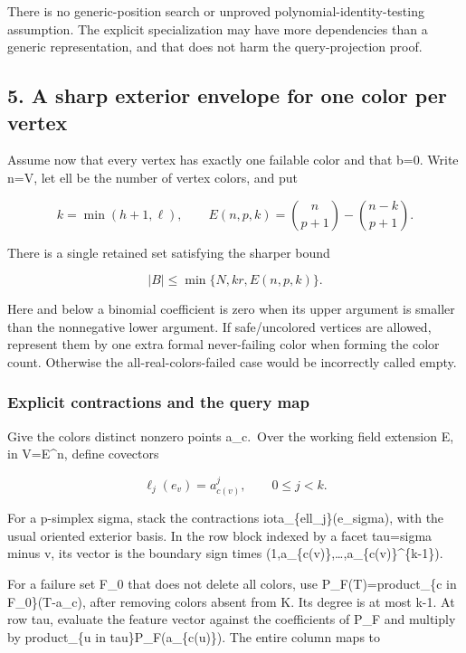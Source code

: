 There is no generic-position search or unproved polynomial-identity-testing assumption. The explicit specialization may have more dependencies than a generic representation, and that does not harm the query-projection proof.

\hypertarget{af-3f6acd6e5b-a-sharp-exterior-envelope-for-one-color-per-vertex}{%
\subsection{5. A sharp exterior envelope for one color per vertex}\label{af-3f6acd6e5b-a-sharp-exterior-envelope-for-one-color-per-vertex}}

Assume now that every vertex has exactly one failable color and that b=0. Write n=\textbar V\textbar, let ell be the number of vertex colors, and put

\[
k=\min(h+1,\ell),\qquad
 E(n,p,k)=\binom n{p+1}-\binom{n-k}{p+1}.
 \tag{T15}
\]

There is a single retained set satisfying the sharper bound

\[
|B|\le\min\{N,kr,E(n,p,k)\}.
 \tag{T16}
\]

Here and below a binomial coefficient is zero when its upper argument is smaller than the nonnegative lower argument. If safe/uncolored vertices are allowed, represent them by one extra formal never-failing color when forming the color count. Otherwise the all-real-colors-failed case would be incorrectly called empty.

\hypertarget{af-3f6acd6e5b-explicit-contractions-and-the-query-map}{%
\subsubsection{Explicit contractions and the query map}\label{af-3f6acd6e5b-explicit-contractions-and-the-query-map}}

Give the colors distinct nonzero points a\_c.~Over the working field extension E, in V=E\^{}n, define covectors

\[
\ell_j(e_v)=a_{c(v)}^j,\qquad 0\le j<k.
 \tag{T17}
\]

For a p-simplex sigma, stack the contractions iota\_\{ell\_j\}(e\_sigma), with the usual oriented exterior basis. In the row block indexed by a facet tau=sigma minus v, its vector is the boundary sign times (1,a\_\{c(v)\},\ldots,a\_\{c(v)\}\^{}\{k-1\}).

For a failure set F\_0 that does not delete all colors, use P\_F(T)=product\_\{c in F\_0\}(T-a\_c), after removing colors absent from K. Its degree is at most k-1. At row tau, evaluate the feature vector against the coefficients of P\_F and multiply by product\_\{u in tau\}P\_F(a\_\{c(u)\}). The entire column maps to

